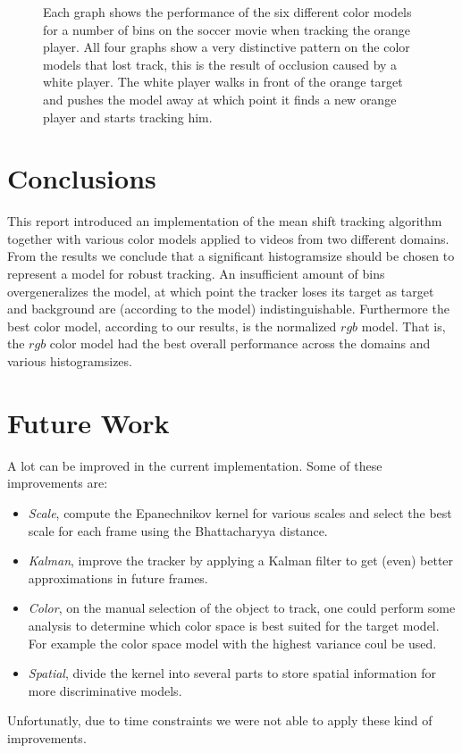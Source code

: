 \documentclass[11pt]{article}
\begin{document}
\begin{figure}[!ht]
{\label{fig:d}
}
\caption{Each graph shows the performance of the six different color models for
a number of bins on the soccer movie when tracking the orange player. All four
graphs show a very distinctive pattern on the color models that lost track, this
is the result of occlusion caused by a white player. The white player walks in
front of the orange target and pushes the model away at which point it finds a
new orange player and starts tracking him.}
\label{fig:soccer}
\end{figure}

\section{Conclusions}
This report introduced an implementation of the mean shift tracking algorithm
together with various color models applied to videos from two different domains.
From the results we conclude that a significant histogramsize should be chosen
to represent a model for robust tracking. An insufficient amount of bins
overgeneralizes the model, at which point the tracker loses its target as
target and background are (according to the model) indistinguishable.
Furthermore the best color model, according to our results, is the normalized
$rgb$ model. That is, the $rgb$ color model had the best overall performance
across the domains and various histogramsizes.

\newpage
\section{Future Work}
A lot can be improved in the current implementation. Some of these improvements
are:
\begin{itemize}
\item{\emph{Scale}, compute the Epanechnikov kernel for various scales and
select the best scale for each frame using the Bhattacharyya distance.}
\item{\emph{Kalman}, improve the tracker by applying a Kalman filter to get
(even) better approximations in future frames.}
\item{\emph{Color}, on the manual selection of the object to track, one could
perform some analysis to determine which color space is best suited for the
target model. For example the color space model with the highest variance coul
be used.}
\item{\emph{Spatial}, divide the kernel into several parts to store spatial
information for more discriminative models.}
\end{itemize}
Unfortunatly, due to time constraints we were not able to apply these kind of
improvements.

\renewcommand\bibname{References}


\end{document}

